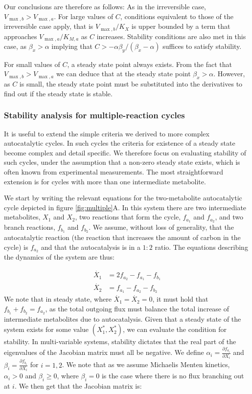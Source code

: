 Our conclusions are therefore as follows:
As in the irreversible case, $V_{\max,b}>V_{\max,a}$.
For large values of $C$, conditions equivalent to those of the irreversible case apply, that is $V_{\max,b}/K_X$ is upper bounded by a term that approaches $V_{\max,a}/K_{M,a}$ as $C$ increases.
Stability conditions are also met in this case, as $\beta_x>\alpha$ implying that $C>-\alpha\beta_y/(\beta_x-\alpha)$ suffices to satisfy stability.

For small values of $C$, a steady state point always exists.
From the fact that $V_{\max,b}>V_{\max,a}$ we can deduce that at the steady state point $\beta_x>\alpha$.
However, as $C$ is small, the steady state point must be substituted into the derivatives to find out if the steady state is stable.
   \subsubsection{Stability analysis for multiple-reaction cycles}
    It is useful to extend the simple criteria we derived to more complex autocatalytic cycles.
    In such cycles the criteria for existence of a steady state become complex and detail specific.
    We therefore focus on evaluating stability of such cycles, under the assumption that a non-zero steady state exists, which is often known from experimental measurements.
    The most straightforward extension is for cycles with more than one intermediate metabolite.

    We start by writing the relevant equations for the two-metabolite autocatalytic cycle depicted in figure \ref{fig:multiple}A.
    In this system there are two intermediate metabolites, $X_1$ and $X_2$, two reactions that form the cycle, $f_{a_1}$ and $f_{a_2}$, and two branch reactions, $f_{b_1}$ and $f_{b_2}$.
    We assume, without loss of generality, that the autocatalytic reaction (the reaction that increases the amount of carbon in the cycle) is $f_{a_2}$ and that the autocatalysis is in a $1:2$ ratio.
    The equations describing the dynamics of the system are thus:

    \begin{align*}
        \dot{X_1} & =2f_{a_2}-f_{a_1}-f_{b_1} \\
        \dot{X_2} & =f_{a_1}-f_{a_2}-f_{b_2}
    \end{align*}
    We note that in steady state, where $\dot{X_1}=\dot{X_2}=0$, it must hold that $f_{b_1}+f_{b_2}=f_{a_2}$, as the total outgoing flux must balance the total increase of intermediate metabolites due to autocatalysis.
    Given that a steady state of the system exists for some value $(X_1^*,X_2^*)$, we can evaluate the condition for stability.
    In multi-variable systems, stability dictates that the real part of the eigenvalues of the Jacobian matrix must all be negative.
    We define $\alpha_i=\frac{\partial f_{a_i}}{\partial X_i}$ and $\beta_i=\frac{\partial f_{b_i}}{\partial X_i}$ for $i=1,2$.
    We note that as we assume Michaelis Menten kinetics, $\alpha_i>0$ and $\beta_i \geq 0$, where $\beta_i=0$ is the case where there is no flux branching out at $i$.
    We then get that the Jacobian matrix is:

